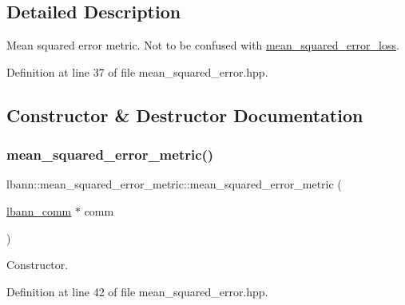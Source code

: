 \subsection{Detailed Description}
Mean squared error metric. Not to be confused with \hyperlink{classlbann_1_1mean__squared__error__loss}{mean\+\_\+squared\+\_\+error\+\_\+loss}. 

Definition at line 37 of file mean\+\_\+squared\+\_\+error.\+hpp.



\subsection{Constructor \& Destructor Documentation}
\mbox{\label{classlbann_1_1mean__squared__error__metric_ae8a430d4cb0b350606839ea7b9eda69d}} 
\subsubsection{\texorpdfstring{mean\+\_\+squared\+\_\+error\+\_\+metric()}{mean\_squared\_error\_metric()}\hspace{0.1cm}{\footnotesize\ttfamily [1/2]}}
{\footnotesize\ttfamily lbann\+::mean\+\_\+squared\+\_\+error\+\_\+metric\+::mean\+\_\+squared\+\_\+error\+\_\+metric (\begin{DoxyParamCaption}\item[{\hyperlink{classlbann_1_1lbann__comm}{lbann\+\_\+comm} $\ast$}]{comm }\end{DoxyParamCaption})\hspace{0.3cm}{\ttfamily [inline]}}

Constructor. 

Definition at line 42 of file mean\+\_\+squared\+\_\+error.\+hpp.


